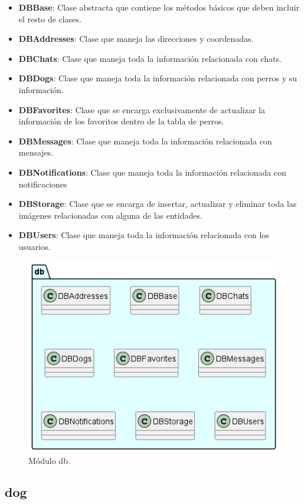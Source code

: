 \documentclass[a4paper, 12pt]{article}
\begin{document}
\begin{itemize}[noitemsep]
	\item \textbf{DBBase}: Clase abstracta que contiene los métodos básicos que deben incluir el resto de clases.
	\item \textbf{DBAddresses}: Clase que maneja las direcciones y coordenadas.
	\item \textbf{DBChats}: Clase que maneja toda la información relacionada con chats.
	\item \textbf{DBDogs}: Clase que maneja toda la información relacionada con perros y su información.
	\item \textbf{DBFavorites}: Clase que se encarga exclusivamente de actualizar la información de los favoritos dentro de la tabla de perros.
	\item \textbf{DBMessages}: Clase que maneja toda la información relacionada con mensajes.
	\item \textbf{DBNotifications}: Clase que maneja toda la información relacionada con notificaciones
	\item \textbf{DBStorage}: Clase que se encarga de insertar, actualizar y eliminar toda las imágenes relacionadas con alguna de las entidades.
	\item \textbf{DBUsers}: Clase que maneja toda la información relacionada con los usuarios.
\end{itemize}

\begin{figure}[H]
	\begin{center}
		{\includegraphics[width=0.7\linewidth]{diagram/DB.png}\par}
		\caption{Módulo db.}
	\end{center}
\end{figure}


\subsection*{dog}
\end{document}
